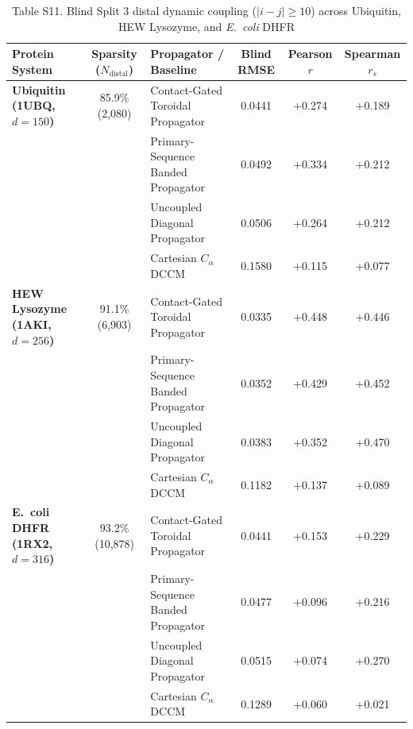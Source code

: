 \documentclass[10pt,letterpaper]{article}
\begin{document}
\begin{table}[!htbp]
\centering
\caption*{Table S11. Blind Split 3 distal dynamic coupling ($|i-j|\ge 10$) across Ubiquitin, HEW Lysozyme, and \textit{E.\ coli} DHFR}
\footnotesize
\renewcommand{\arraystretch}{1.12}
\setlength{\tabcolsep}{5.2pt}
\begin{tabular}{@{}l c l c c c@{}}
\toprule[1.1pt]
\textbf{Protein System} & \textbf{Sparsity ($N_{\mathrm{distal}}$)} & \textbf{Propagator / Baseline} & \textbf{Blind RMSE} & \textbf{Pearson $r$} & \textbf{Spearman $r_s$} \\
\midrule[0.6pt]
\textbf{Ubiquitin (1UBQ, $d=150$)} & 85.9\% (2,080) & Contact-Gated Toroidal Propagator & 0.0441 & +0.274 & +0.189 \\

 &  & Primary-Sequence Banded Propagator & 0.0492 & +0.334 & +0.212 \\

 &  & Uncoupled Diagonal Propagator & 0.0506 & +0.264 & +0.212 \\

 &  & Cartesian $C_\alpha$ DCCM & 0.1580 & +0.115 & +0.077 \\
\midrule[0.4pt]
\textbf{HEW Lysozyme (1AKI, $d=256$)} & 91.1\% (6,903) & Contact-Gated Toroidal Propagator & 0.0335 & +0.448 & +0.446 \\

 &  & Primary-Sequence Banded Propagator & 0.0352 & +0.429 & +0.452 \\

 &  & Uncoupled Diagonal Propagator & 0.0383 & +0.352 & +0.470 \\

 &  & Cartesian $C_\alpha$ DCCM & 0.1182 & +0.137 & +0.089 \\
\midrule[0.4pt]
\textbf{E.\ coli DHFR (1RX2, $d=316$)} & 93.2\% (10,878) & Contact-Gated Toroidal Propagator & 0.0441 & +0.153 & +0.229 \\

 &  & Primary-Sequence Banded Propagator & 0.0477 & +0.096 & +0.216 \\

 &  & Uncoupled Diagonal Propagator & 0.0515 & +0.074 & +0.270 \\

 &  & Cartesian $C_\alpha$ DCCM & 0.1289 & +0.060 & +0.021 \\

\bottomrule[1.1pt]
\end{tabular}
\end{table}
\end{document}

